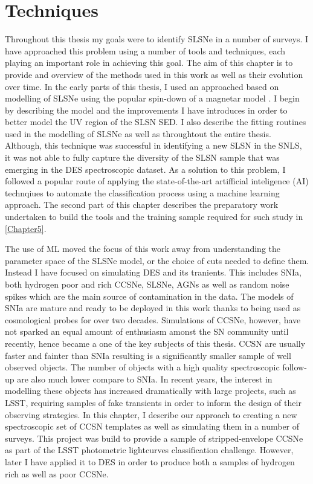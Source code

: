 \chapter{Techniques}
\label{Chapter4}

Throughout this thesis my goals were to identify SLSNe in a number of surveys. I have approached this problem using a number of tools and techniques, each playing an important role in achieving this goal. The aim of this chapter is to provide and overview of the methods used in this work as well as their evolution over time. In the early parts of this thesis, I used an approached based on modelling of SLSNe using the popular spin-down of a magnetar model . I begin by describing the model and the improvements I have introduces in order to better model the UV region of the SLSN SED. I also describe the fitting routines used in the modelling of SLSNe as well as throughtout the entire thesis. Although, this technique was successful in identifying a new SLSN in the SNLS, it was not able to fully capture the diversity of the SLSN sample that was emerging in the DES spectroscopic dataset. As a solution to this problem, I followed a popular route of applying the state-of-the-art artifficial inteligence (AI) technqiues to automate the classification process using a machine learning approach. The second part of this chapter describes the preparatory work undertaken to build the tools and the training sample required for such study in \cref{Chapter5}.

The use of ML moved the focus of this work away from understanding the parameter space of the SLSNe model, or the choice of cuts needed to define them. Instead I have focused on simulating DES and its tranients. This includes SNIa, both hydrogen poor and rich CCSNe, SLSNe, AGNs as well as random noise spikes which are the main source of contamination in the data. The models of SNIa are mature and ready to be deployed in this work thanks to being used as cosmological probes for over two decades. Simulations of CCSNe, however, have not sparked an equal amount of enthusiasm amonst the SN community until recently, hence became a one of the key subjects of this thesis. CCSN are usually faster and fainter than SNIa resulting is a significantly smaller sample of well observed objects. The number of objects with a high quality spectroscopic follow-up are also much lower compare to SNIa. In recent years, the interest in modelling these objects has increased dramatically with large projects, such as LSST, requiring samples of fake transients in order to inform the design of their observing strategies. In this chapter, I describe our approach to creating a new spectroscopic set of CCSN templates as well as simulating them in a number of surveys. This project was build to provide a sample of stripped-envelope CCSNe as part of the LSST photometric lightcurves classification challenge. However, later I have applied it to DES in order to produce both a samples of hydrogen rich as well as poor CCSNe.

